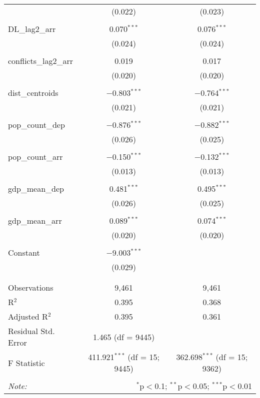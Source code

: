 \begin{table}[!htbp]
\begin{tabular}{@{\extracolsep{5pt}}lcc}
  & (0.022) & (0.023) \\ 
  & & \\ 
 DL\_lag2\_arr & 0.070$^{***}$ & 0.076$^{***}$ \\ 
  & (0.024) & (0.024) \\ 
  & & \\ 
 conflicts\_lag2\_arr & 0.019 & 0.017 \\ 
  & (0.020) & (0.020) \\ 
  & & \\ 
 dist\_centroids & $-$0.803$^{***}$ & $-$0.764$^{***}$ \\ 
  & (0.021) & (0.021) \\ 
  & & \\ 
 pop\_count\_dep & $-$0.876$^{***}$ & $-$0.882$^{***}$ \\ 
  & (0.026) & (0.025) \\ 
  & & \\ 
 pop\_count\_arr & $-$0.150$^{***}$ & $-$0.132$^{***}$ \\ 
  & (0.013) & (0.013) \\ 
  & & \\ 
 gdp\_mean\_dep & 0.481$^{***}$ & 0.495$^{***}$ \\ 
  & (0.026) & (0.025) \\ 
  & & \\ 
 gdp\_mean\_arr & 0.089$^{***}$ & 0.074$^{***}$ \\ 
  & (0.020) & (0.020) \\ 
  & & \\ 
 Constant & $-$9.003$^{***}$ &  \\ 
  & (0.029) &  \\ 
  & & \\ 
\hline \\[-1.8ex] 
Observations & 9,461 & 9,461 \\ 
R$^{2}$ & 0.395 & 0.368 \\ 
Adjusted R$^{2}$ & 0.395 & 0.361 \\ 
Residual Std. Error & 1.465 (df = 9445) &  \\ 
F Statistic & 411.921$^{***}$ (df = 15; 9445) & 362.698$^{***}$ (df = 15; 9362) \\ 
\hline 
\hline \\[-1.8ex] 
\textit{Note:}  & \multicolumn{2}{r}{$^{*}$p$<$0.1; $^{**}$p$<$0.05; $^{***}$p$<$0.01} \\ 
\end{tabular} 
\end{table} 
